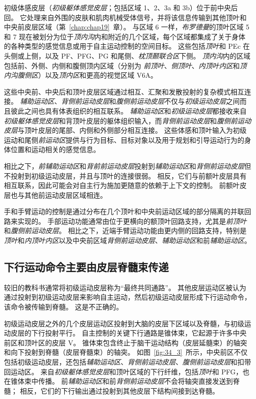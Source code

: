 初级体感皮层（\textit{初级躯体感觉皮层}；包括区域 1、2、3a 和 3b）位于前中央后回。
它处理来自外围的皮肤和肌肉机械受体信号，并将该信息传输到其他顶叶和中央前皮层区域（第~\ref{chap:chap19}~章）。
与区域 6 一样，\textit{布罗德曼}的顶叶区域 5 和 7 现在被划分为位于\textit{顶内沟}内和附近的几个区域，每个区域都集成了关于身体的各种类型的感觉信息或用于自主运动控制的空间目标。
这些包括\textit{顶叶}和 PEc 在头侧或上侧，以及 PF、PFG、PG 和尾侧、\textit{枕顶颞联合区}下侧。
\textit{顶内沟}内的区域包括前、外侧、内侧和腹侧顶内区域（分别为 \textit{前顶叶}、\textit{侧顶叶}、\textit{内顶叶内区}和\textit{顶内沟腹侧区}）以及\textit{顶内区}和更高的视觉区域 V6A。


这些中央前、中央后和顶叶皮层区域通过相互、汇聚和发散投射的复杂模式相互连接。
\textit{辅助运动区}、\textit{背侧前运动皮层}和\textit{腹侧前运动皮层}不仅与\textit{初级运动皮层}之间而且彼此之间也具有体表组织的相互联系。
\textit{辅助运动区}和\textit{初级运动皮层}都接收来自\textit{初级躯体感觉皮层}和背顶叶皮层的躯体组织输入，而\textit{背侧前运动皮层}和\textit{腹侧前运动皮层}与顶叶皮层的尾部、内侧和外侧部分相互连接。
这些体感和顶叶输入为初级运动和尾侧\textit{前运动区}提供与行为目标、目标对象以及用于规划和引导运动行为的身体位置和运动相关的感觉信息。


相比之下，\textit{前辅助运动区}和\textit{背前前运动皮层}投射到\textit{辅助运动区}和\textit{背侧前运动皮层}但不投射到初级运动皮层，并且与顶叶的连接很弱。
相反，它们与前额叶皮层具有相互联系，因此可能会对自主行为施加更随意的依赖于上下文的控制。
前额叶皮层也与其他前运动皮层区域相连。


手和手臂运动的控制是通过分布在几个顶叶和中央前运动区域的部分隔离的并联回路来实现的。
手部运动功能通常由位于更横向的额顶叶回路支持，尤其是\textit{前顶叶}和\textit{腹侧前运动皮层}。
相比之下，近端手臂运动功能由更内侧的回路支持，特别是\textit{顶叶}和\textit{内顶叶内区}以及中央前区域\textit{背侧前运动皮层}、\textit{辅助运动区}和前\textit{辅助运动区}。



\subsection{下行运动命令主要由皮层脊髓束传递}

较旧的教科书通常将初级运动皮层称为“最终共同通路”。
其他皮层运动区被认为通过投射到初级运动皮层来影响自主运动，然后初级运动皮层形成下行运动命令，该命令被传输到脊髓。
这是不正确的。


初级运动皮层之外的几个皮层运动区投射到大脑的皮层下区域以及脊髓，与初级运动皮层的下行投射平行。
自主控制的关键下行通路是锥体束，它起源于许多中央前区和顶叶区的皮层 V。
锥体束包含终止于脑干运动结构（皮层延髓束）的轴突和向下投射到脊髓（皮层脊髓束）的轴突。
如图~\ref{fig:34_3}~所示，中央前区不仅包括初级运动皮层，还包括\textit{辅助运动区}、\textit{背侧前运动皮层}、\textit{腹侧前运动皮层}和扣带回运动区。
来自\textit{初级躯体感觉皮层}和顶叶区域的下行纤维，包括\textit{顶叶}和 PFG，也在锥体束中传播。
前\textit{辅助运动区}和前\textit{背侧前运动皮层}不会将轴突直接发送到脊髓；
相反，它们的下行输出通过投射到其他皮层下结构间接到达脊髓。


